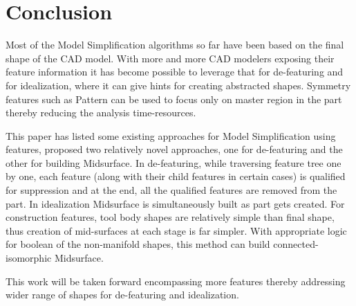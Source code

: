 
\section{Conclusion}

Most of the Model Simplification algorithms so far have been based on the final shape of the CAD model. With more and more CAD modelers exposing their feature information it has become possible to leverage that for de-featuring and for idealization, where it can give hints for creating abstracted shapes. Symmetry features such as Pattern can be used to focus only on master region in the part thereby reducing the analysis time-resources. 
	
This paper has listed some existing approaches for Model Simplification using features, proposed two relatively novel approaches, one for de-featuring and the other for building Midsurface. In de-featuring, while traversing feature tree one by one, each feature (along with their child features in certain cases) is qualified for suppression and at the end, all the qualified features are removed from the part. In idealization Midsurface is simultaneously built as part gets created. For construction features, tool body shapes are relatively simple than final shape, thus creation of mid-surfaces at each stage is far simpler. With appropriate logic for boolean of the non-manifold shapes, this method can build connected-isomorphic Midsurface. 

This work will be taken forward encompassing more features thereby addressing wider range of shapes for de-featuring and idealization.
